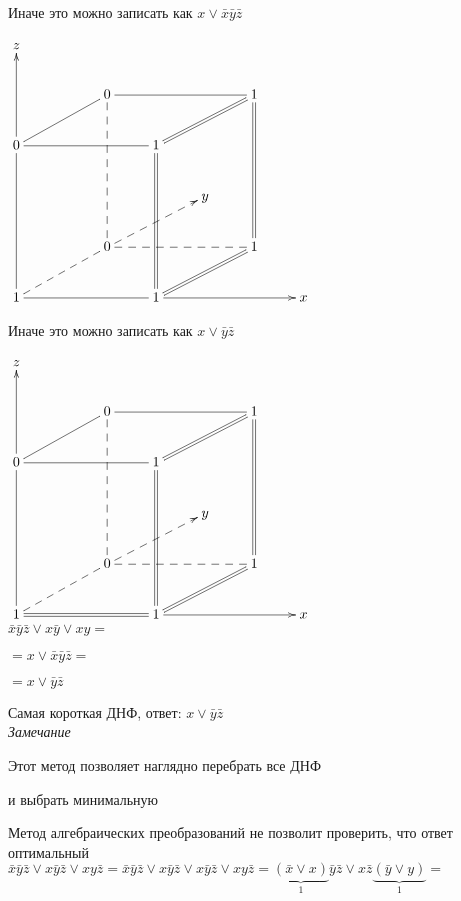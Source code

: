 \documentclass[a4paper, 12pt] {article}
\begin{document}
Иначе это можно записать как $ x \vee  \bar x \bar y \bar z $

$ 
\begin{matrix}
	\xymatrix{
		z &   &  &   & & &\\
		&   & 0 \ar@{-}[lld] \ar@{--}[ddd] &   & & 1 \ar@{=}[lld] \ar@{-}[lll]&\\
		0 \ar@{->}[uu] \ar@{-}[rrr] &   &  & 1  & & &\\
		&   &  &   & y & &\\
		&   & 0 \ar@{--}[lld] \ar@{-->}[rru] \ar@{--}[rrr] &   & & 1 \ar@{=}[uuu]  &\\
		1  \ar@{-}[uuu] \ar@{-}[rrr] & & & 1 \ar@{->}[rrr] \ar@{=}[uuu] \ar@{=}[rru] & & & x \\
	}
\end{matrix}
$

\newpage

Иначе это можно записать как $ x \vee  \bar y \bar z $

$ 
\begin{matrix}
	\xymatrix{
		z &   &  &   & & &\\
		&   & 0 \ar@{-}[lld] \ar@{--}[ddd] &   & & 1 \ar@{=}[lld] \ar@{-}[lll]&\\
		0 \ar@{->}[uu] \ar@{-}[rrr] &   &  & 1  & & &\\
		&   &  &   & y & &\\
		&   & 0 \ar@{--}[lld] \ar@{-->}[rru] \ar@{--}[rrr] &   & & 1 \ar@{=}[uuu]  &\\
		1  \ar@{-}[uuu] \ar@{=}[rrr] & & & 1 \ar@{->}[rrr] \ar@{=}[uuu] \ar@{=}[rru] & & & x \\
	}
\end{matrix}
$\\

$ \bar x \bar y \bar z \vee  x \bar y  \vee  x  y =$

$ = x \vee  \bar x \bar y \bar z =$

$= x \vee  \bar y \bar z $

Самая короткая ДНФ, ответ: $ x \vee  \bar y \bar z $\\

\textit{Замечание}

Этот метод позволяет наглядно перебрать все ДНФ

 и выбрать минимальную

Метод алгебраических преобразований не позволит проверить, что ответ оптимальный\\

 $ \bar x \bar y \bar z \vee  x \bar y \bar z \vee  x  y \bar z = \bar x \bar y \bar z \vee  x \bar y \bar z \vee  x \bar y \bar z \vee  x  y \bar z = \underbrace{(\bar x \vee x)}_1 \bar y \bar z \vee x \bar z \underbrace{(\bar y \vee y)}_1=$
 
\end{document}

